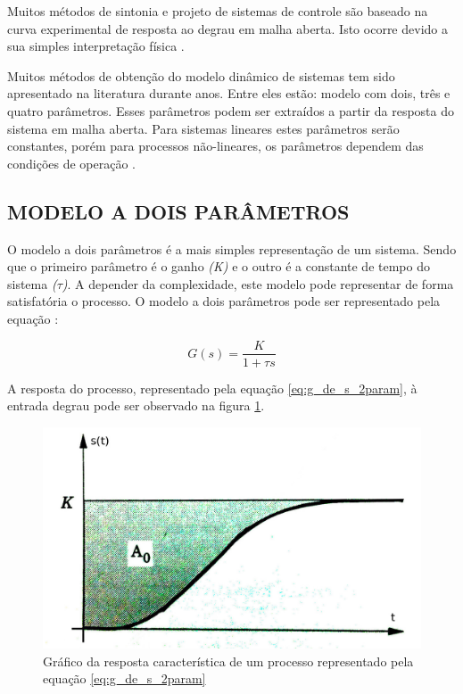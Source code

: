 \documentclass[12pt,oneside,a4paper, chapter=TITLE, section = TITLE, english, brazil]{abntex2}
\begin{document}
Muitos métodos de sintonia e projeto de sistemas de controle são baseado na curva experimental de resposta ao degrau em malha aberta. Isto ocorre devido a sua simples interpretação física \cite{astrom}.

Muitos métodos de obtenção do modelo dinâmico de sistemas tem sido apresentado na literatura durante anos. Entre eles estão: modelo com dois, três e quatro parâmetros. Esses parâmetros podem ser extraídos a partir da resposta do sistema em malha aberta. Para sistemas lineares estes parâmetros serão constantes, porém para processos não-lineares, os parâmetros dependem das condições de operação \cite{astrom}.


\subsection{MODELO A DOIS PARÂMETROS} \label{sec:mod_2_param} %

O modelo a dois parâmetros é a mais simples representação de um sistema. Sendo que o primeiro parâmetro é o ganho \textit{(K)} e o outro é a constante de tempo do sistema \textit{($\tau$)}. A depender da complexidade, este modelo pode representar de forma satisfatória o processo. O modelo a dois parâmetros pode ser representado pela equação \cite{astrom}:

\begin{equation}
G(s) = \frac{K}{1 + \tau s} \label{eq:g_de_s_2param}
\end{equation}

A resposta do processo, representado pela equação \ref{eq:g_de_s_2param}, à entrada degrau  pode ser observado na figura \ref{fig:resp_g_de_s_2param}.

\begin{figure}[h] %
\centering
\includegraphics[scale=0.3]{./imagens/resp_g2}
\caption[Gráfico da resposta característica de um processo representado pela equação \ref{eq:g_de_s_2param}]{Gráfico da resposta característica de um processo representado pela equação \ref{eq:g_de_s_2param} \cite{astrom}}
\label{fig:resp_g_de_s_2param}
\end{figure}
\end{document}
